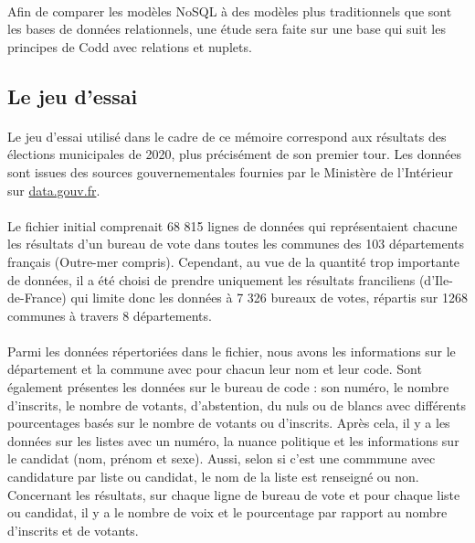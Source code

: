 \paragraph{}Afin de comparer les modèles NoSQL à des modèles plus traditionnels que sont les bases de données relationnels, une étude sera faite sur une base qui suit les principes de Codd avec relations et nuplets.

\subsection{Le jeu d'essai}
\paragraph{}Le jeu d'essai utilisé dans le cadre de ce mémoire correspond aux résultats des élections municipales de 2020, plus précisément de son premier tour. Les données sont issues des sources gouvernementales fournies par le Ministère de l'Intérieur sur \url{data.gouv.fr}.

\paragraph{}Le fichier initial comprenait 68 815 lignes de données qui représentaient chacune les résultats d'un bureau de vote dans toutes les communes des 103 départements français (Outre-mer compris). Cependant, au vue de la quantité trop importante de données, il a été choisi de prendre uniquement les résultats franciliens (d'Ile-de-France) qui limite donc les données à 7 326 bureaux de votes, répartis sur 1268 communes à travers 8 départements. 

\paragraph{}Parmi les données répertoriées dans le fichier, nous avons les informations sur le département et la commune avec pour chacun leur nom et leur code. Sont également présentes les données sur le bureau de code : son numéro, le nombre d'inscrits, le nombre de votants, d'abstention, du nuls ou de blancs avec différents pourcentages basés sur le nombre de votants ou d'inscrits. Après cela, il y a les données sur les listes avec un numéro, la nuance politique et les informations sur le candidat (nom, prénom et sexe). Aussi, selon si c'est une commmune avec candidature par liste ou candidat, le nom de la liste est renseigné ou non. Concernant les résultats, sur chaque ligne de bureau de vote et pour chaque liste ou candidat, il y a le nombre de voix et le pourcentage par rapport au nombre d'inscrits et de votants.

